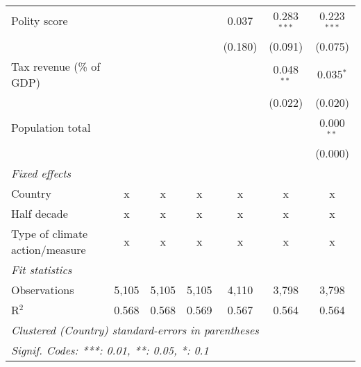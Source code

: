 \begin{tabular}{lcccccc}
   Polity score                                                   &         &              &                & 0.037          & 0.283$^{***}$  & 0.223$^{***}$\\   
                                                                  &         &              &                & (0.180)        & (0.091)        & (0.075)\\   
   Tax revenue (\% of GDP)                                        &         &              &                &                & 0.048$^{**}$   & 0.035$^{*}$\\   
                                                                  &         &              &                &                & (0.022)        & (0.020)\\   
   Population total                                               &         &              &                &                &                & 0.000$^{**}$\\   
                                                                  &         &              &                &                &                & (0.000)\\   
   \emph{Fixed effects}\\
   Country                                                        & x       & x            & x              & x              & x              & x\\  
   Half decade                                                    & x       & x            & x              & x              & x              & x\\  
   Type of climate action/measure                                 & x       & x            & x              & x              & x              & x\\  
   \midrule \emph{Fit statistics}\\
   Observations                                                   & 5,105   & 5,105        & 5,105          & 4,110          & 3,798          & 3,798\\  
   R$^2$                                                          & 0.568   & 0.568        & 0.569          & 0.567          & 0.564          & 0.564\\  
   \midrule
   \multicolumn{7}{l}{\emph{Clustered (Country) standard-errors in parentheses}}\\
   \multicolumn{7}{l}{\emph{Signif. Codes: ***: 0.01, **: 0.05, *: 0.1}}\\
\end{tabular}
\par\endgroup


